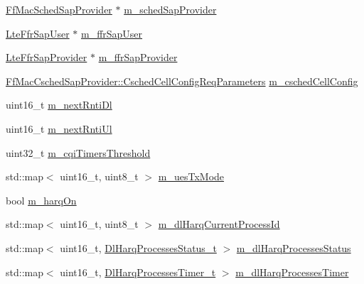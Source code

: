 \begin{DoxyCompactItemize}
\item 
\hyperlink{classns3_1_1FfMacSchedSapProvider}{Ff\+Mac\+Sched\+Sap\+Provider} $\ast$ \hyperlink{classns3_1_1RrFfMacScheduler_ab15e0bbc67a80549487697c081286bf3}{m\+\_\+sched\+Sap\+Provider}
\item 
\hyperlink{classns3_1_1LteFfrSapUser}{Lte\+Ffr\+Sap\+User} $\ast$ \hyperlink{classns3_1_1RrFfMacScheduler_ae2f349417c42a9b789fd8c1e90b2a067}{m\+\_\+ffr\+Sap\+User}
\item 
\hyperlink{classns3_1_1LteFfrSapProvider}{Lte\+Ffr\+Sap\+Provider} $\ast$ \hyperlink{classns3_1_1RrFfMacScheduler_aa132ef239271d50757c71c4d16af73cb}{m\+\_\+ffr\+Sap\+Provider}
\item 
\hyperlink{structns3_1_1FfMacCschedSapProvider_1_1CschedCellConfigReqParameters}{Ff\+Mac\+Csched\+Sap\+Provider\+::\+Csched\+Cell\+Config\+Req\+Parameters} \hyperlink{classns3_1_1RrFfMacScheduler_a809c6237863709f97fc450b1a2ba60d4}{m\+\_\+csched\+Cell\+Config}
\item 
uint16\+\_\+t \hyperlink{classns3_1_1RrFfMacScheduler_a7c5404bfe1ef2446a6e920a9d80a8f51}{m\+\_\+next\+Rnti\+Dl}
\item 
uint16\+\_\+t \hyperlink{classns3_1_1RrFfMacScheduler_afd1cdb17c29e2a04980e4bea7d537e0f}{m\+\_\+next\+Rnti\+Ul}
\item 
uint32\+\_\+t \hyperlink{classns3_1_1RrFfMacScheduler_a51ae1963d7d95e89917af4c603f08a91}{m\+\_\+cqi\+Timers\+Threshold}
\item 
std\+::map$<$ uint16\+\_\+t, uint8\+\_\+t $>$ \hyperlink{classns3_1_1RrFfMacScheduler_acaf305dd7717f4ced31f1dfc07df68ea}{m\+\_\+ues\+Tx\+Mode}
\item 
bool \hyperlink{classns3_1_1RrFfMacScheduler_aa57694b4b80d2dc907f1e5281d3defab}{m\+\_\+harq\+On}
\item 
std\+::map$<$ uint16\+\_\+t, uint8\+\_\+t $>$ \hyperlink{classns3_1_1RrFfMacScheduler_a1e8b17ba5e424b3d11c217b32c41faac}{m\+\_\+dl\+Harq\+Current\+Process\+Id}
\item 
std\+::map$<$ uint16\+\_\+t, \hyperlink{namespacens3_a457b3571b67ff17d042e9894e90e2ce2}{Dl\+Harq\+Processes\+Status\+\_\+t} $>$ \hyperlink{classns3_1_1RrFfMacScheduler_aa3d12b5abcb9afeea093150a6572aaed}{m\+\_\+dl\+Harq\+Processes\+Status}
\item 
std\+::map$<$ uint16\+\_\+t, \hyperlink{namespacens3_a39413ade536de4b1c82d6c0074cc703e}{Dl\+Harq\+Processes\+Timer\+\_\+t} $>$ \hyperlink{classns3_1_1RrFfMacScheduler_ab5040cff67dad6c8fdfc9c32c90916df}{m\+\_\+dl\+Harq\+Processes\+Timer}
\item 

\end{DoxyCompactItemize}
